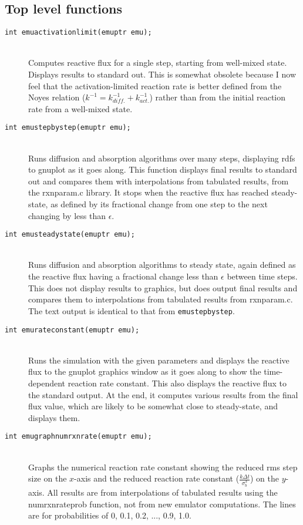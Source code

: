 \documentclass {book}
\begin{document}
\subsection{Top level functions}

\begin{description}

\item[\texttt{int emuactivationlimit(emuptr emu);}]
\hfill \\
Computes reactive flux for a single step, starting from well-mixed state. Displays results to standard out. This is somewhat obsolete because I now feel that the activation-limited reaction rate is better defined from the Noyes relation ($k^{-1} = k_{diff.}^{-1}+k_{act.}^{-1}$) rather than from the initial reaction rate from a well-mixed state.

\item[\texttt{int emustepbystep(emuptr emu);}]
\hfill \\
Runs diffusion and absorption algorithms over many steps, displaying rdfs to gnuplot as it goes along. This function displays final results to standard out and compares them with interpolations from tabulated results, from the rxnparam.c library. It stops when the reactive flux has reached steady-state, as defined by its fractional change from one step to the next changing by less than $\epsilon$.

\item[\texttt{int emusteadystate(emuptr emu);}]
\hfill \\
Runs diffusion and absorption algorithms to steady state, again defined as the reactive flux having a fractional change less than $\epsilon$ between time steps. This does not display results to graphics, but does output final results and compares them to interpolations from tabulated results from rxnparam.c. The text output is identical to that from \texttt{emustepbystep}.

\item[\texttt{int emurateconstant(emuptr emu);}]
\hfill \\
Runs the simulation with the given parameters and displays the reactive flux to the gnuplot graphics window as it goes along to show the time-dependent reaction rate constant. This also displays the reactive flux to the standard output. At the end, it computes various results from the final flux value, which are likely to be somewhat close to steady-state, and displays them.

\item[\texttt{int emugraphnumrxnrate(emuptr emu);}]
\hfill \\
Graphs the numerical reaction rate constant showing the reduced rms step size on the $x$-axis and the reduced reaction rate constant ($\frac{k \Delta t}{\sigma_b^3}$) on the $y$-axis. All results are from interpolations of tabulated results using the numrxnrateprob function, not from new emulator computations. The lines are for probabilities of 0, 0.1, 0.2, ..., 0.9, 1.0.

\end{description}
\end{document}
